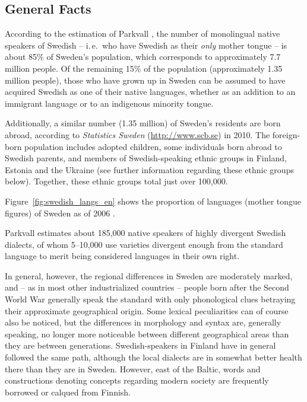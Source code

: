 \begin{multicols}{2}

\subsection{General Facts}

According to the estimation of Parkvall \cite{parkvall2009}, the
number of monolingual native speakers of Swedish -- i.\,e.~who have
Swedish as their \emph{only} mother tongue -- is about 85\% of
Sweden’s population, which corresponds to approximately 7.7 million
people. Of the remaining 15\% of the population (approximately 1.35
million people), those who have grown up in Sweden can be assumed to
have acquired Swedish as one of their native languages, whether as an
addition to an immigrant language or to an indigenous minority tongue.


Additionally, a similar number (1.35 million) of Sweden's residents
are born abroad, according to \textit{Statistics
  Sweden} (\url{http://www.scb.se}) in 2010. The foreign-born
population includes adopted children, some individuals born abroad to
Swedish parents, and members of Swedish-speaking ethnic groups in
Finland, Estonia and the Ukraine (see further information regarding
these ethnic groups below). Together, these ethnic groups total just
over 100,000.

Figure~\ref{fig:swedish_langs_en} shows the proportion of languages (mother tongue figures) of Sweden as of 2006 \cite{parkvall2009}.

Parkvall \cite{parkvall2009} estimates about 185,000 native speakers
of highly divergent Swedish dialects, of whom 5--10,000 use varieties
divergent enough from the standard language to merit being considered
languages in their own right.

In general, however, the regional differences in Sweden are moderately
marked, and -- as in most other industrialized countries -- people born
after the Second World War generally speak the standard with only
phonological clues betraying their approximate geographical
origin. Some lexical peculiarities can of course also be noticed, but
the differences in morphology and syntax are, generally speaking, no
longer more noticeable between different geographical areas than they
are between generations. Swedish-speakers in Finland have in general
followed the same path, although the local dialects are in somewhat
better health there than they are in Sweden. However, east of the
Baltic, words and constructions denoting concepts regarding modern
society are frequently borrowed or calqued from Finnish.


\end{multicols}

